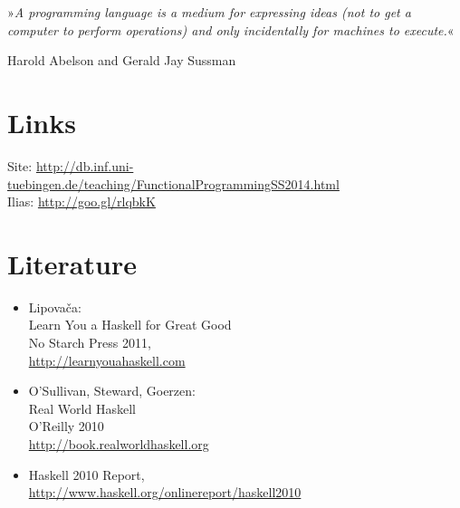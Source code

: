 \documentclass[12pt,a4paper]{article}
\begin{document}
\newpage

\vspace*{\fill}
»\textit{A programming language is a medium for expressing ideas (not to get a computer to perform operations) and only incidentally for machines to execute.}«\\
\begin{flushright}
    Harold Abelson and Gerald Jay Sussman
\end{flushright}
\vspace*{\fill}

\newpage


\section*{Links}

Site: \url{http://db.inf.uni-tuebingen.de/teaching/FunctionalProgrammingSS2014.html}\\
Ilias: \url{http://goo.gl/rlqbkK}


\section*{Literature}

\begin{itemize}
    \item Lipovača: \\ Learn You a Haskell for Great Good \\ No Starch Press 2011, \\ \url{http://learnyouahaskell.com}
    \item O'Sullivan, Steward, Goerzen: \\ Real World Haskell \\ O'Reilly 2010 \\ \url{http://book.realworldhaskell.org}
    \item Haskell 2010 Report, \\ \url{http://www.haskell.org/onlinereport/haskell2010}
\end{itemize}


\pagebreak


\pagebreak
\newcommand{\codeline}[1]{\texttt{#1}}


\pagebreak

%
% 
%
% 
%
% 
%
% 
\end{document}
